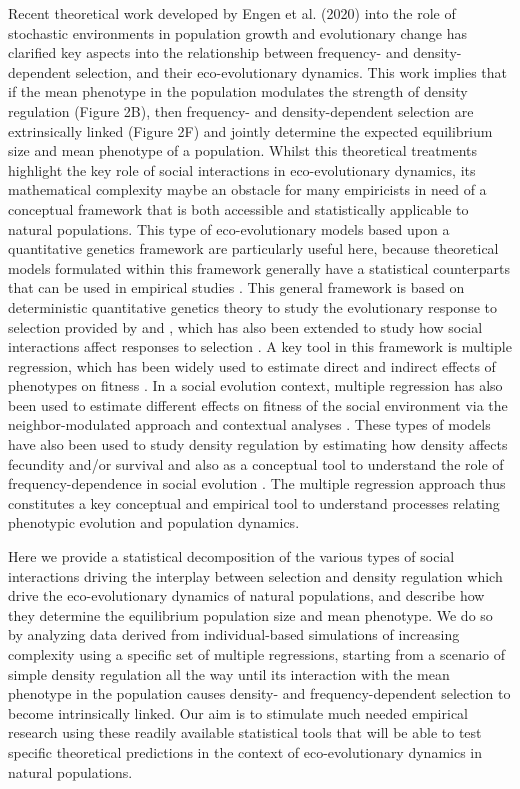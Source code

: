 \documentclass{article}
\begin{document}
 Recent theoretical work developed by Engen et al. (2020) into the role of stochastic environments in population growth and evolutionary change has clarified key aspects into the relationship between frequency- and density-dependent selection, and their eco-evolutionary dynamics. This work implies that if the mean phenotype in the population modulates the strength of density regulation (Figure 2B), then frequency- and density-dependent selection are extrinsically linked (Figure 2F) and jointly determine the expected equilibrium size and mean phenotype of a population. Whilst this theoretical treatments highlight the key role of social interactions in eco-evolutionary dynamics, its mathematical complexity maybe an obstacle for many empiricists in need of a conceptual framework that is both accessible and statistically applicable to natural populations. This type of eco-evolutionary models based upon a quantitative genetics framework are particularly useful here, because theoretical models formulated within this framework generally have a statistical counterparts that can be used in empirical studies  \citep{Lande1983, Robertson1966}. This general framework is based on deterministic quantitative genetics theory to study the evolutionary response to selection provided by \cite{Lande1976, Lande1979} and \cite{Lande1983}, which has also been extended to study how social interactions affect responses to selection \citep{Queller1985a, Wolf1999SocialSelection, McGlothlin2010}. A key tool in this framework is multiple regression, which has been widely used to estimate direct and indirect effects of phenotypes on fitness \citep{Kingsolver2011}. In a social evolution context, multiple regression has also been used to estimate different effects on fitness of the social environment via the neighbor-modulated approach and contextual analyses \citep{Heisler1987, Okasha2006}. These types of models have also been used to study density regulation by estimating how density affects fecundity and/or survival \citep{Araya-Ajoy2021, Saether2021} and also as a conceptual tool to understand the role of frequency-dependence in social evolution \citep{Araya-Ajoy2020, Westneat2012a}. The multiple regression approach thus constitutes a key conceptual and empirical tool to understand processes relating phenotypic evolution and population dynamics. 

Here we provide a statistical decomposition of the various types of social interactions driving the interplay between selection and density regulation which drive the eco-evolutionary dynamics of natural populations, and describe how they determine the equilibrium population size and mean phenotype. We do so by analyzing data derived from individual-based simulations of increasing complexity using a specific set of multiple regressions, starting from a scenario of simple density regulation all the way until its interaction with the mean phenotype in the population causes density- and frequency-dependent selection to become intrinsically linked. Our aim is to stimulate much needed empirical research using these readily available statistical tools that will be able to test specific theoretical predictions in the context of eco-evolutionary dynamics in natural populations.
\end{document}
